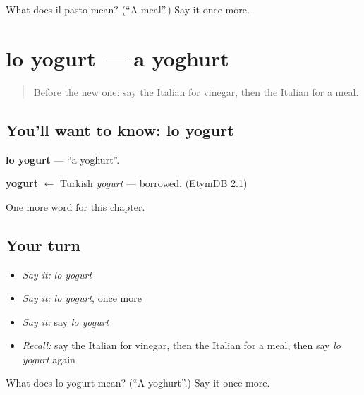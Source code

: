 \begin{tcolorbox}[breakable,colback=teal!4,colframe=teal!35!black,title={Before you move on}]
What does il pasto mean? (\textquotedblleft{}A meal\textquotedblright{}.) Say it once more.
\end{tcolorbox}
\section[lo yogurt]{lo yogurt — a yoghurt}

\label{lesson:IT-C109-yogurt}



\begin{quote}
Before the new one: say the Italian for vinegar, then the Italian for a meal.
\end{quote}

\subsection*{You'll want to know: lo yogurt}
\textbf{lo yogurt} — \textquotedblleft{}a yoghurt\textquotedblright{}.

\begin{cousinweb}
\textbf{yogurt} $\leftarrow$ Turkish \emph{yogurt} — borrowed. (EtymDB 2.1)
\end{cousinweb}

\begin{grammarlens}[title={What you've built}]
One more word for this chapter.
\end{grammarlens}

\subsection*{Your turn}
\begin{itemize}
\raggedright
  \item \emph{Say it:} \emph{lo yogurt}
  \item \emph{Say it:} \emph{lo yogurt}, once more
  \item \emph{Say it:} say \emph{lo yogurt}
  \item \emph{Recall:} say the Italian for vinegar, then the Italian for a meal, then say \emph{lo yogurt} again
\end{itemize}

\begin{tcolorbox}[breakable,colback=teal!4,colframe=teal!35!black,title={Before you move on}]
What does lo yogurt mean? (\textquotedblleft{}A yoghurt\textquotedblright{}.) Say it once more.
\end{tcolorbox}
